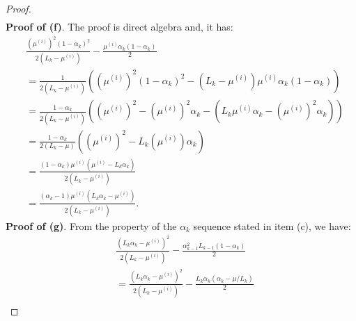 \documentclass[12pt]{article}
\begin{document}
\begin{proof}
\begin{align*}
            \end{align*}
            \textbf{Proof of (f)}.
            The proof is direct algebra and, it has: 
            {\small\allowdisplaybreaks
            \begin{align*}
                & \frac{\left(\mu^{(i)}\right)^2(1 - \alpha_k)^2}{2(L_k - \mu^{(i)})} 
                - \frac{\mu^{(i)}\alpha_k(1 - \alpha_k)}{2}
                \\
                &= 
                \frac{1}{2\left(L_k - \mu^{(i)}\right)}
                \left(
                    \left(\mu^{(i)}\right)^2(1 - \alpha_k)^2
                    - \left(L_k - \mu^{(i)}\right)\mu^{(i)} \alpha_k(1 - \alpha_k)
                \right)
                \\
                &= \frac{1 - \alpha_k}{2\left(L_k - \mu^{(i)}\right)}\left(
                    \left(\mu^{(i)}\right)^2 
                    - \left(\mu^{(i)}\right)^2\alpha_k 
                    - \left(L_k \mu^{(i)} \alpha_k - \left(\mu^{(i)}\right)^2 \alpha_k\right)
                \right)
                \\
                &= 
                \frac{1 - \alpha_k}{2(L_k - \mu)}\left(
                    \left(\mu^{(i)}\right)^2 - L_k\left(\mu^{(i)}\right)\alpha_k
                \right)
                \\
                &= 
                \frac{(1 - \alpha_k)\mu^{(i)}\left(\mu^{(i)} - L_k\alpha_k\right)}
                {2\left(L_k - \mu^{(i)}\right)}
                \\
                &= \frac{(\alpha_k - 1)\mu^{(i)}\left(L_k\alpha_k - \mu^{(i)}\right)}
                {2\left(L_k - \mu^{(i)}\right)}. 
            \end{align*}
            }
            \textbf{Proof of (g)}.
            From the property of the $\alpha_k$ sequence stated in item (c), we have: 
            \begin{align*}
                &\frac{\left(
                    L_k\alpha_k - \mu^{(i)}
                \right)^2}{2(L_k - \mu^{(i)})} 
                -
                \frac{\alpha_{k - 1}^2L_{k - 1}(1 - \alpha_k)}{2} 
                \\
                &= 
                \frac{\left(
                    L_k\alpha_k - \mu^{(i)}
                \right)^2}{2(L_k - \mu^{(i)})} 
                -
                \frac{L_k\alpha_k(\alpha_k - \mu/L_k)}{2} 
                \\

\end{align*}
\end{proof}
\end{document}
